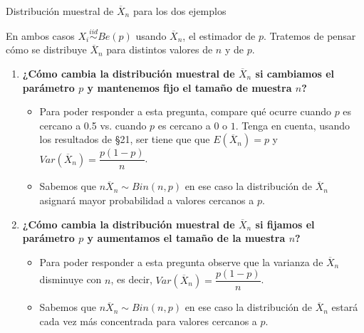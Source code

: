 \documentclass{beamer}
\theoremstyle{definition}
\begin{document}
\begin{frame}[fragile]{\color{rosee}Distribuci\'on muestral de $\overline{X}_n$ para los dos ejemplos}\small
  
  En ambos casos $X_i\stackrel{iid}{\sim}Be(p)$ usando $\overline{X}_n$, el estimador de $p$. Tratemos de pensar cómo se distribuye $\overline{X}_n$ para distintos valores de $n$ y de $p$.
  
 \begin{enumerate}
      \item \textbf{¿Cómo cambia la distribución muestral de $\overline{X}_n$ si cambiamos el parámetro $p$ y mantenemos fijo el tamaño de muestra $n$?  }	
        \begin{itemize}
     \item Para poder responder a esta pregunta, compare qué ocurre cuando $p$ es cercano a 0.5 vs. cuando $p$ es cercano a $0$ o $1$. Tenga en cuenta, usando los resultados de \S21, ser tiene que que $E(\overline{X}_n)=p$ y $Var(\overline{X}_n)=\dfrac{p(1-p)}{n}$.
     \item Sabemos que $n\overline{X}_n \sim Bin(n,p)$ en ese caso la distribución de $\overline{X}_n$ asignará mayor probabilidad a valores cercanos a $p$.
    \end{itemize}
  	
  
    \item \textbf{¿Cómo cambia la distribución muestral de $\overline{X}_n$ si fijamos el parámetro $p$ y aumentamos el
    tama\~no de la muestra $n$?}
     \begin{itemize}
     \item Para poder responder a esta pregunta observe que la varianza de $\overline{X}_n$ disminuye con $n$, es decir, $Var(\overline{X}_n)=\dfrac{p(1-p)}{n}$.
     \item Sabemos que $n\overline{X}_n \sim 
     Bin(n,p)$ en ese caso la distribución de $\overline{X}_n$ estará cada vez más concentrada para valores cercanos a $p$.
    \end{itemize}
    \end{enumerate}
  
\end{frame}
\end{document}
